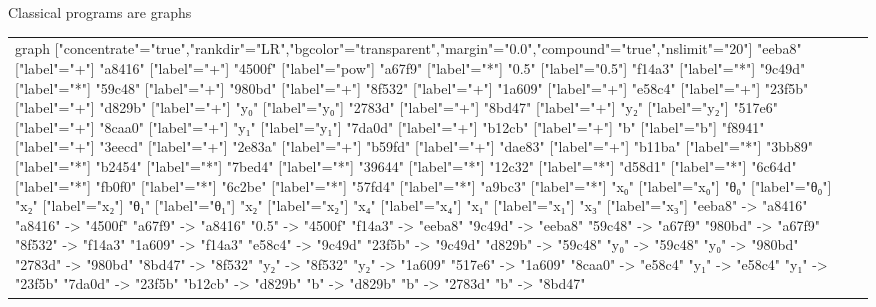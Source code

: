 \documentclass{beamer}
\begin{document}
\begin{frame}[fragile]{Classical programs are graphs}
\begin{table}[H]
\begin{tabular}{lcc}
\begin{adjustbox}{minipage={.25\textwidth}, height=0.14\textwidth, margin*=0cm 0cm 0cm 0.1cm}
{            graph ["concentrate"="true","rankdir"="LR","bgcolor"="transparent","margin"="0.0","compound"="true","nslimit"="20"]
            "eeba8" ["label"="+"]
            "a8416" ["label"="+"]
            "4500f" ["label"="pow"]
            "a67f9" ["label"="*"]
            "0.5" ["label"="0.5"]
            "f14a3" ["label"="*"]
            "9c49d" ["label"="*"]
            "59c48" ["label"="+"]
            "980bd" ["label"="+"]
            "8f532" ["label"="+"]
            "1a609" ["label"="+"]
            "e58c4" ["label"="+"]
            "23f5b" ["label"="+"]
            "d829b" ["label"="+"]
            "y₀" ["label"="y₀"]
            "2783d" ["label"="+"]
            "8bd47" ["label"="+"]
            "y₂" ["label"="y₂"]
            "517e6" ["label"="+"]
            "8caa0" ["label"="+"]
            "y₁" ["label"="y₁"]
            "7da0d" ["label"="+"]
            "b12cb" ["label"="+"]
            "b" ["label"="b"]
            "f8941" ["label"="+"]
            "3eecd" ["label"="+"]
            "2e83a" ["label"="+"]
            "b59fd" ["label"="+"]
            "dae83" ["label"="+"]
            "b11ba" ["label"="*"]
            "3bb89" ["label"="*"]
            "b2454" ["label"="*"]
            "7bed4" ["label"="*"]
            "39644" ["label"="*"]
            "12c32" ["label"="*"]
            "d58d1" ["label"="*"]
            "6c64d" ["label"="*"]
            "fb0f0" ["label"="*"]
            "6c2be" ["label"="*"]
            "57fd4" ["label"="*"]
            "a9bc3" ["label"="*"]
            "x₀" ["label"="x₀"]
            "θ₀" ["label"="θ₀"]
            "x₂" ["label"="x₂"]
            "θ₁" ["label"="θ₁"]
            "x₂" ["label"="x₂"]
            "x₄" ["label"="x₄"]
            "x₁" ["label"="x₁"]
            "x₃" ["label"="x₃"]
            "eeba8" -> "a8416"
            "a8416" -> "4500f"
            "a67f9" -> "a8416"
            "0.5" -> "4500f"
            "f14a3" -> "eeba8"
            "9c49d" -> "eeba8"
            "59c48" -> "a67f9"
            "980bd" -> "a67f9"
            "8f532" -> "f14a3"
            "1a609" -> "f14a3"
            "e58c4" -> "9c49d"
            "23f5b" -> "9c49d"
            "d829b" -> "59c48"
            "y₀" -> "59c48"
            "y₀" -> "980bd"
            "2783d" -> "980bd"
            "8bd47" -> "8f532"
            "y₂" -> "8f532"
            "y₂" -> "1a609"
            "517e6" -> "1a609"
            "8caa0" -> "e58c4"
            "y₁" -> "e58c4"
            "y₁" -> "23f5b"
            "7da0d" -> "23f5b"
            "b12cb" -> "d829b"
            "b" -> "d829b"
            "b" -> "2783d"
            "b" -> "8bd47"
}
\end{adjustbox}
\end{tabular}
\end{table}
\end{frame}
\end{document}
